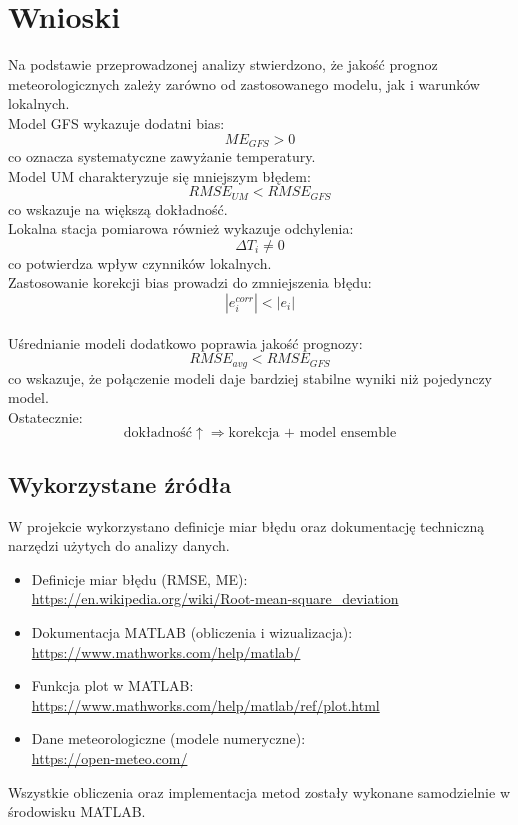 \documentclass[a4paper,12pt]{article}
\begin{document}
\section{Wnioski}

Na podstawie przeprowadzonej analizy stwierdzono, że jakość prognoz meteorologicznych zależy zarówno od zastosowanego modelu, jak i warunków lokalnych.
\\

\noindent
Model GFS wykazuje dodatni bias:
\[
ME_{GFS} > 0
\]
co oznacza systematyczne zawyżanie temperatury.
\\

\noindent
Model UM charakteryzuje się mniejszym błędem:
\[
RMSE_{UM} < RMSE_{GFS}
\]
co wskazuje na większą dokładność.
\\

\noindent
Lokalna stacja pomiarowa również wykazuje odchylenia:
\[
\Delta T_i \neq 0
\]
co potwierdza wpływ czynników lokalnych.
\\

\noindent
Zastosowanie korekcji bias prowadzi do zmniejszenia błędu:
\[
|e_i^{corr}| < |e_i|
\]
\\

\noindent
Uśrednianie modeli dodatkowo poprawia jakość prognozy:
\[
RMSE_{avg} < RMSE_{GFS}
\]
co wskazuje, że połączenie modeli daje bardziej stabilne wyniki niż pojedynczy model.
\\

\noindent
Ostatecznie:
\[
\text{dokładność} \uparrow \Rightarrow \text{korekcja + model ensemble}
\]
\newpage
\subsection{Wykorzystane źródła}

W projekcie wykorzystano definicje miar błędu oraz dokumentację techniczną narzędzi użytych do analizy danych.

\begin{itemize}
    \item Definicje miar błędu (RMSE, ME): \\
    \url{https://en.wikipedia.org/wiki/Root-mean-square_deviation}

    \item Dokumentacja MATLAB (obliczenia i wizualizacja): \\
    \url{https://www.mathworks.com/help/matlab/}

    \item Funkcja plot w MATLAB: \\
    \url{https://www.mathworks.com/help/matlab/ref/plot.html}

    \item Dane meteorologiczne (modele numeryczne): \\
    \url{https://open-meteo.com/}
\end{itemize}
\noindent
Wszystkie obliczenia oraz implementacja metod zostały wykonane samodzielnie w środowisku MATLAB.
\end{document}
